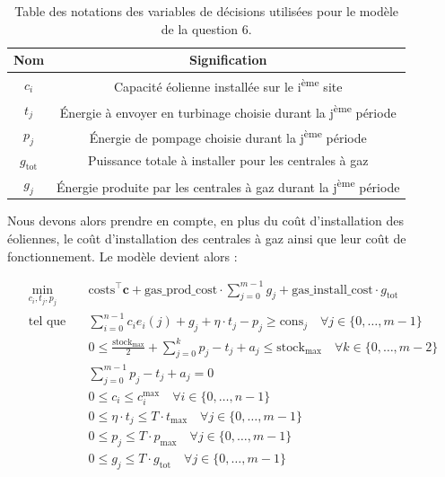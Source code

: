 \documentclass{article}
\begin{document}
\begin{table}[h!]
    \centering
    \renewcommand{\arraystretch}{1.5}%
    \begin{tabular}{|c || c |} 
        \hline
        Nom & Signification\\
        \hline\hline
        $c_i$ & Capacité éolienne installée sur le i\textsuperscript{ème} site\\
        $t_j$ & Énergie à envoyer en turbinage choisie durant la j\textsuperscript{ème} période\\
        $p_j$ & Énergie de pompage choisie durant la j\textsuperscript{ème} période\\
        $g_\mathrm{tot}$ & Puissance totale à installer pour les centrales à gaz\\
        $g_j$ & \'Energie produite par les centrales à gaz durant la j\textsuperscript{ème} période\\
        \hline
    \end{tabular}
    \caption{Table des notations des variables de décisions utilisées pour le modèle de la question 6.} 
    \label{table:notations_variables_6}
\end{table}

\noindent Nous devons alors prendre en compte, en plus du coût d'installation des éoliennes, le coût d'installation des centrales à gaz ainsi que leur coût de fonctionnement.
Le modèle devient alors :

\begin{align}
    \min_{c_{i},t_j,p_j} \quad &\mathrm{costs}^\intercal\mathbf{c} + \mathrm{gas\_prod\_cost}\cdot \sum_{j=0}^{m-1} g_j + \mathrm{gas\_install\_cost} \cdot g_\mathrm{tot}\nonumber\\
    \textrm{tel que} \quad & \sum_{i=0}^{n-1} c_i e_i(j) + g_j + \eta \cdot t_j - p_j \ge \mathrm{cons}_j \quad \forall j \in  \{ 0, \ldots, m-1 \}\label{eq:6_contr1}\\
    & 0 \le \frac{\mathrm{stock}_\mathrm{max}}{2}  + \sum_{j=0}^{k} p_j - t_j + a_j \le  \mathrm{stock}_\mathrm{max} \quad \forall k \in \{ 0, \ldots, m-2 \}\label{eq:6_contr2}\\
    & \sum_{j=0}^{m-1} p_j - t_j + a_j = 0 \label{eq:6_contr3}\\
    & 0 \le c_i \le c_i^\mathrm{max} \quad \forall i \in  \{ 0, \ldots, n-1 \}  \label{eq:6_contr4}\\
    & 0 \le \eta \cdot t_j \le  T \cdot t_\mathrm{max} \quad \forall j \in  \{ 0, \ldots, m-1 \}  \label{eq:6_contr5}\\
    & 0 \le p_j \le  T \cdot p_\mathrm{max} \quad \forall j \in  \{ 0, \ldots, m-1 \} \label{eq:6_contr6}\\
    & 0 \le g_j \le T \cdot g_\mathrm{tot} \quad \forall j \in  \{ 0, \ldots, m-1 \} \label{eq:6_contr7}
\end{align}
\end{document}
